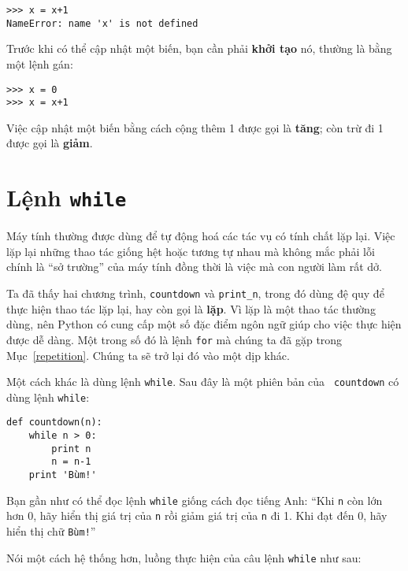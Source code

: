 \documentclass[11pt]{book}
\begin{document}
\beforeverb
\begin{verbatim}
>>> x = x+1
NameError: name 'x' is not defined
\end{verbatim}
\afterverb
%
Trước khi có thể cập nhật một biến, bạn cần phải {\bf khởi tạo}
nó, thường là bằng một lệnh gán:


\beforeverb
\begin{verbatim}
>>> x = 0
>>> x = x+1
\end{verbatim}
\afterverb
%
Việc cập nhật một biến bằng cách cộng thêm 1 được gọi là 
{\bf tăng}; còn trừ đi 1 được gọi là {\bf giảm}.





\section{Lệnh {\tt while}}


Máy tính thường được dùng để tự động hoá các tác vụ có tính chất lặp
lại. Việc lặp lại những thao tác giống hệt hoặc tương tự nhau mà không
mắc phải lỗi chính là ``sở trường'' của máy tính đồng thời là việc mà
con người làm rất dở.

Ta đã thấy hai chương trình, {\tt countdown} và \verb"print_n", trong
đó dùng đệ quy để thực hiện thao tác lặp lại, hay còn gọi  là {\bf
lặp}.  Vì lặp là một thao tác thường dùng, nên Python có cung cấp một
số đặc điểm ngôn ngữ giúp cho việc thực hiện được dễ dàng. Một trong 
số đó là lệnh {\tt for} mà chúng ta đã gặp trong Mục~\ref{repetition}.
Chúng ta sẽ trở lại đó vào một dịp khác.

Một cách khác là dùng lệnh {\tt while}.  Sau đây là một phiên bản của {\tt
countdown} có dùng lệnh {\tt while}:

\beforeverb
\begin{verbatim}
def countdown(n):
    while n > 0:
        print n
        n = n-1
    print 'Bùm!'
\end{verbatim}
\afterverb
%
Bạn gần như có thể đọc lệnh {\tt while} giống cách đọc tiếng Anh:
``Khi {\tt n} còn lớn hơn 0, hãy hiển thị giá trị của {\tt n} 
rồi giảm giá trị của {\tt n} đi 1.  Khi đạt đến 0, hãy hiển thị chữ {\tt Bùm!}''


Nói một cách hệ thống hơn, luồng thực hiện của câu lệnh {\tt while} như sau:
\end{document}
